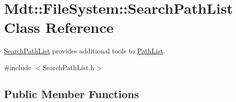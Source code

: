 \hypertarget{class_mdt_1_1_file_system_1_1_search_path_list}{}\section{Mdt\+:\+:File\+System\+:\+:Search\+Path\+List Class Reference}
\label{class_mdt_1_1_file_system_1_1_search_path_list}


\hyperlink{class_mdt_1_1_file_system_1_1_search_path_list}{Search\+Path\+List} provides additional tools to \hyperlink{class_mdt_1_1_file_system_1_1_path_list}{Path\+List}.  




{\ttfamily \#include $<$Search\+Path\+List.\+h$>$}

\subsection*{Public Member Functions}

